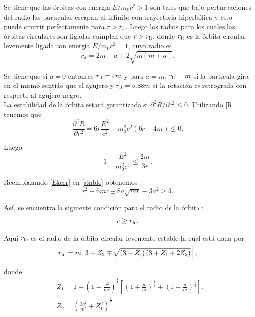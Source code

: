 Se tiene que las \'orbitas con energ\'ia $E/m_0c^2>1$ son tales que bajo perturbaciones del radio las part\'iculas escapan al infinito con trayectoria hiperb\'olica y esto puede ocurrir perfectamente para $r>r_{\rm f}$. Luego los radios para los cuales las \'orbitas circulares son ligadas cumplen que $r>r_{\rm ll}$, donde $r_{\rm ll}$ es la \'orbita circular levemente ligada con energ\'ia $E/m_0c^2=1$, cuyo radio es
\begin{equation}\label{mborbit}
r_{ll}=2m\mp a+2\sqrt{m\left(m\mp a \right)}.
\end{equation}

Se tiene que si $a=0$ entonces $r_{\rm ll}=4m$ y para $a=m$, $r_{\rm ll}=m$ si la part\'icula gira en el mismo sentido que el agujero y $r_{\rm ll}=5.83m$ si la rotaci\'on es retrograda con respecto al agujero negro.\\

La estabilidad de la \'orbita estar\'a garantizada si $\partial^2 R/\partial r^2 \leq 0$. Utilizando \eqref{R} tenemos que
\begin{equation}
\frac{\partial^2 R}{\partial r^2}=6r\frac{E^2}{c^2}-m_0^2c^2\left(6r-4m\right) \leq 0.
\end{equation}

Luego
\begin{equation}\label{stable}
1-\frac{E^2}{m_0^2c^4} \leq \frac{2m}{3r}.
\end{equation}

Reemplazando \eqref{Ekerr} en \eqref{stable} obtenemos
\begin{equation}
r^2-6mr\pm 8a\sqrt{mr}-3a^2 \geq 0.
\end{equation}

As\'i, se encuentra la siguiente condici\'on para el radio de la \'orbita :
\begin{equation}
r \geq r_{\rm le}.
\end{equation}

Aqu\'i $r_{\rm le}$ es el radio de la \'orbita circular levemente estable la cual est\'a dada por
\begin{equation}
r_{\rm le}=m\left[ 3+Z_2\mp \sqrt{\left(3-Z_1\right)\left( 3+Z_1+2Z_2\right)}\right],
\end{equation}

donde
\begin{eqnarray}
&Z_1=1+\left( 1-\frac{a^2}{m^2}\right)^{\frac{1}{3}}\left[\left( 1+\frac{a}{m}\right)^{\frac{1}{3}}+\left( 1-\frac{a}{m}\right)^{\frac{1}{3}} \right] ,\\
&Z_2 =\left(\frac{3a^2}{m^2}+Z_1^2 \right)^{\frac{1}{2}}.
\end{eqnarray}

